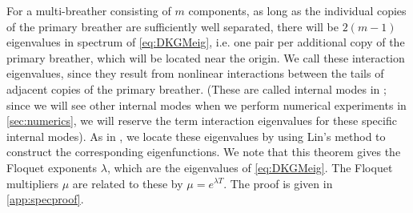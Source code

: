 \documentclass[12pt,reqno]{amsart}
\theoremstyle{definition}
\begin{document}
For a multi-breather consisting of $m$ components, as long as the individual copies of the primary breather are sufficiently well separated, there will be $2(m-1)$ eigenvalues in spectrum of \cref{eq:DKGMeig}, i.e. one pair per additional copy of the primary breather, which will be located near the origin. We call these interaction eigenvalues, since they result from nonlinear interactions between the tails of adjacent copies of the primary breather. (These are called internal modes in \cite{cuevas-maraver2016}; since we will see other internal modes when we perform numerical experiments in \cref{sec:numerics}, we will reserve the term interaction eigenvalues for these specific internal modes).
As in \cites{Parker2020,Sandstede1998}, we locate these eigenvalues by using Lin's method to construct the corresponding eigenfunctions. We note that this theorem gives the Floquet exponents $\lambda$, which are the eigenvalues of \cref{eq:DKGMeig}. The Floquet multipliers $\mu$ are related to these by $\mu = e^{\lambda T}$. The proof is given in \cref{app:specproof}.
\end{document}
